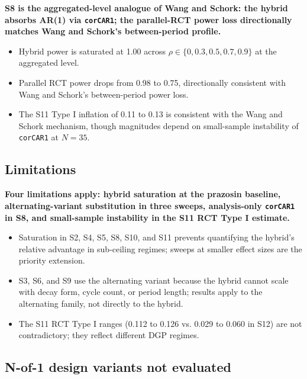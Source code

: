 \documentclass[
  11pt,
]{article}
\begin{document}
\textbf{S8 is the aggregated-level analogue of Wang and Schork: the hybrid absorbs AR(1) via \texttt{corCAR1}; the parallel-RCT power loss directionally matches Wang and Schork's between-period profile.}

\begin{itemize}\setlength{\itemsep}{2pt}\setlength{\parskip}{0pt}
\item Hybrid power is saturated at 1.00 across $\rho \in \{0, 0.3, 0.5, 0.7, 0.9\}$ at the aggregated level.
\item Parallel RCT power drops from 0.98 to 0.75, directionally consistent with Wang and Schork's between-period power loss.
\item The S11 Type I inflation of 0.11 to 0.13 is consistent with the Wang and Schork mechanism, though magnitudes depend on small-sample instability of \texttt{corCAR1} at $N = 35$.
\end{itemize}

\subsection{Limitations}\label{limitations}

\textbf{Four limitations apply: hybrid saturation at the prazosin baseline, alternating-variant substitution in three sweeps, analysis-only \texttt{corCAR1} in S8, and small-sample instability in the S11 RCT Type I estimate.}

\begin{itemize}\setlength{\itemsep}{2pt}\setlength{\parskip}{0pt}
\item Saturation in S2, S4, S5, S8, S10, and S11 prevents quantifying the hybrid's relative advantage in sub-ceiling regimes; sweeps at smaller effect sizes are the priority extension.
\item S3, S6, and S9 use the alternating variant because the hybrid cannot scale with decay form, cycle count, or period length; results apply to the alternating family, not directly to the hybrid.
\item The S11 RCT Type I ranges (0.112 to 0.126 vs. 0.029 to 0.060 in S12) are not contradictory; they reflect different DGP regimes.
\end{itemize}

\subsection{N-of-1 design variants not evaluated}\label{n-of-1-design-variants-not-evaluated}
\end{document}
